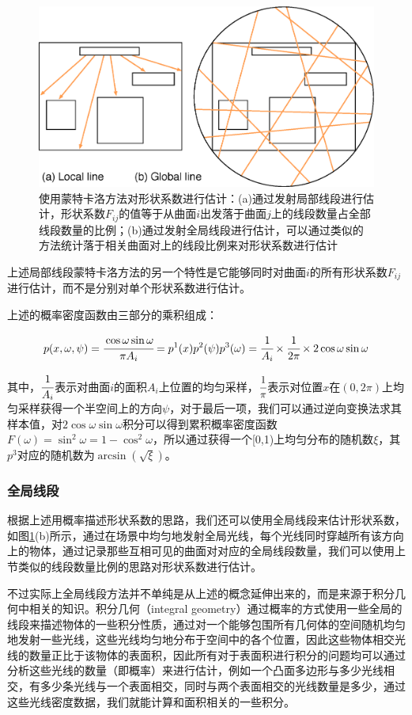 \begin{figure}
\sidecaption
	\includegraphics[width=.65\textwidth]{figures/r/global-vs-local}
	\caption{使用蒙特卡洛方法对形状系数进行估计：(a)通过发射局部线段进行估计，形状系数$F_{ij}$的值等于从曲面$i$出发落于曲面$j$上的线段数量占全部线段数量的比例；(b)通过发射全局线段进行估计，可以通过类似的方法统计落于相关曲面对上的线段比例来对形状系数进行估计}
	\label{f:r-global-vs-local}
\end{figure}

上述局部线段蒙特卡洛方法的另一个特性是它能够同时对曲面$i$的所有形状系数$F_{ij}$进行估计，而不是分别对单个形状系数进行估计。

上述的概率密度函数由三部分的乘积组成：

\begin{equation}
	p(x,{\omega},\psi)= \cfrac{\cos{\omega}\sin{\omega}}{\pi A_i}=p^{1}(x)p^{2}(\psi)p^{3}({\omega})= \cfrac{1}{A_i}\times \cfrac{1}{2\pi}\times 2\cos{\omega}\sin{\omega}
\end{equation}

\noindent 其中，$ \cfrac{1}{A_i}$表示对曲面$i$的面积$A_i$上位置的均匀采样，$ \cfrac{1}{\pi}$表示对位置$x$在$(0,2\pi)$上均匀采样获得一个半空间上的方向$\psi$，对于最后一项，我们可以通过逆向变换法求其样本值，对$2\cos{\omega}\sin{\omega}$积分可以得到累积概率密度函数$F({\omega})=\sin^{2}{\omega}=1-\cos^{2}{\omega}$，所以通过获得一个[0,1)上均匀分布的随机数$\xi$，其$p^{3}$对应的随机数为$\arcsin(\sqrt{\xi})$。




\subsubsection{全局线段}
根据上述用概率描述形状系数的思路，我们还可以使用全局线段来估计形状系数，如图\ref{f:r-global-vs-local}(b)所示，通过在场景中均匀地发射全局光线，每个光线同时穿越所有该方向上的物体，通过记录那些互相可见的曲面对对应的全局线段数量，我们可以使用上节类似的线段数量比例的思路对形状系数进行估计。

不过实际上全局线段方法并不单纯是从上述的概念延伸出来的，而是来源于积分几何中相关的知识。积分几何（integral geometry）\cite{b:Integralgeometryandgeometricprobability}通过概率的方式使用一些全局的线段来描述物体的一些积分性质，通过对一个能够包围所有几何体的空间随机均匀地发射一些光线，这些光线均匀地分布于空间中的各个位置，因此这些物体相交光线的数量正比于该物体的表面积，因此所有对于表面积进行积分的问题均可以通过分析这些光线的数量（即概率）来进行估计，例如一个凸面多边形与多少光线相交，有多少条光线与一个表面相交，同时与两个表面相交的光线数量是多少，通过这些光线密度数据，我们就能计算和面积相关的一些积分。

